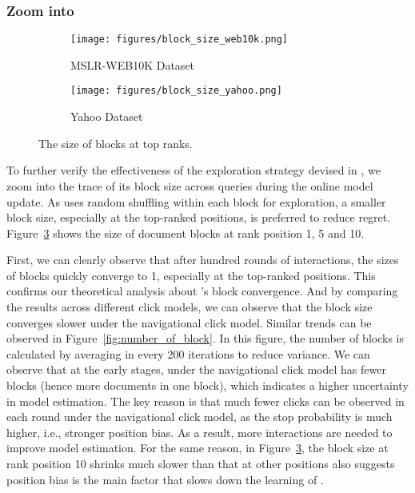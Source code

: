 \subsubsection{Zoom into \model{}}

\begin{figure}[t]
    \centering
    \begin{subfigure}[b]{0.235\textwidth}
    \texttt{[image: figures/block\_size\_web10k.png]}
    \caption{MSLR-WEB10K Dataset}
    \label{fig:block_size_web10k}
    \end{subfigure}
    \begin{subfigure}[b]{0.23\textwidth}
    \texttt{[image: figures/block\_size\_yahoo.png]}
    \caption{Yahoo Dataset}
    \label{fig:block_size_yahoo}
    \end{subfigure}
    \vspace{-4mm}
    \caption{The size of blocks at top ranks.}
    \label{fig:block_size}
    \vspace{-4mm}
\end{figure}


To further verify the effectiveness of the exploration strategy devised in \model{}, we zoom into the trace of its block size across queries during the online model update. As \model{} uses random shuffling within each block for exploration, a smaller block size, especially at the top-ranked positions, is preferred to reduce regret. Figure~\ref{fig:block_size} shows the size of document blocks at rank position 1, 5 and 10. 

First, we can clearly observe that after hundred rounds of interactions, the sizes of blocks quickly converge to 1, especially at the top-ranked positions. This confirms our theoretical analysis about \model{}'s block convergence. And by comparing the results across different click models, we can observe that the block size converges slower under the navigational click model. Similar trends can be observed in Figure~\ref{fig:number_of_block}. In this figure, the number of blocks is calculated by averaging in every 200 iterations to reduce variance. We can observe that at the early stages, \model{} under the navigational click model has fewer blocks (hence more documents in one block), which indicates a higher uncertainty in model estimation. The key reason is that much fewer clicks can be observed in each round under the navigational click model, as the stop probability is much higher, i.e., stronger position bias. As a result, more interactions are needed to improve model estimation. For the same reason, in Figure~\ref{fig:block_size}, the block size at rank position 10 shrinks much slower than that at other positions also suggests position bias is the main factor that slows down the learning of \model{}. 

